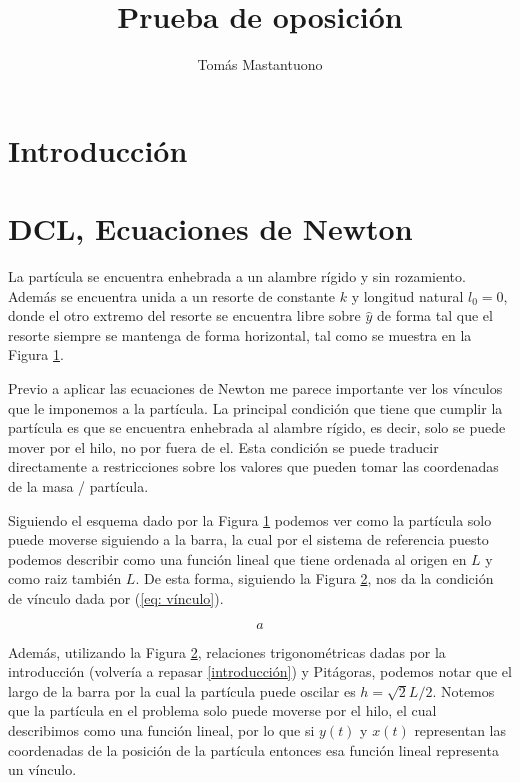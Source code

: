 \documentclass{article}
\author{Tomás Mastantuono}
\begin{document}
\title{Prueba de oposición}
\date{}
\maketitle


\section*{Introducción}
\label{introducción}

\section{DCL, Ecuaciones de Newton}
La partícula se encuentra enhebrada a un alambre rígido y sin rozamiento. Además se encuentra unida a un resorte de constante $k$ y longitud natural $l_0 = 0$, donde el otro extremo del resorte se encuentra libre sobre $\hat{y}$ de forma tal que el resorte siempre se mantenga de forma horizontal, tal como se muestra en la Figura \ref{fig: diagrama_problema}.

\begin{figure}

    \label{fig: diagrama_problema}
\end{figure}

Previo a aplicar las ecuaciones de Newton me parece importante ver los vínculos que le imponemos a la partícula. La principal condición que tiene que cumplir la partícula es que se encuentra enhebrada al alambre rígido, es decir, solo se puede mover por el hilo, no por fuera de el. Esta condición se puede traducir directamente a restricciones sobre los valores que pueden tomar las coordenadas de la masa / partícula.

Siguiendo el esquema dado por la Figura \ref{fig: diagrama_problema} podemos ver como la partícula solo puede moverse siguiendo a la barra, la cual por el sistema de referencia puesto podemos describir como una función lineal que tiene ordenada al origen en $L$ y como raiz también $L$. De esta forma, siguiendo la Figura \ref{fig: vínculo}, nos da la condición de vínculo dada por (\ref{eq: vínculo}).

\begin{figure}
    \label{fig: vínculo}
\end{figure}

\begin{equation}
    a
    \label{eq: vínculo}
\end{equation}

Además, utilizando la Figura \ref{fig: vínculo}, relaciones trigonométricas dadas por la introducción (volvería a repasar \ref{introducción}) y Pitágoras, podemos notar que el largo de la barra por la cual la partícula puede oscilar es $h = \sqrt{2}L/2$.
Notemos que la partícula en el problema solo puede moverse por el hilo, el cual describimos como una función lineal, por lo que si $y(t)$ y $x(t)$ representan las coordenadas de la posición de la partícula entonces esa función lineal representa un vínculo.
\end{document}
